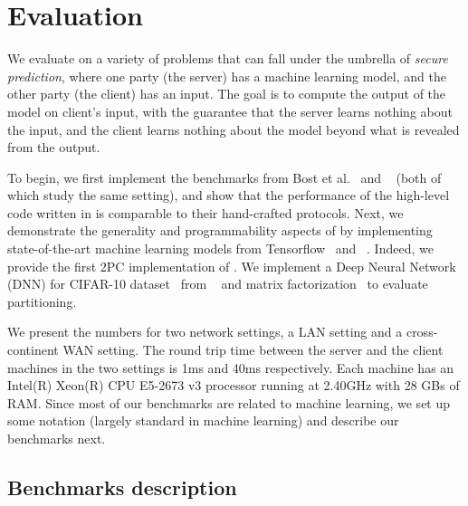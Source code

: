 \section{Evaluation}
\label{sec:eval}
We evaluate \tool on a variety of problems that can fall under the umbrella of {\it secure prediction}, where one
party (the server) has a machine learning model, and the other party
(the client) has an input. The goal is to compute the output of the
model on client's input, with the guarantee that the server
learns nothing about the input, and the client learns nothing
about the model beyond what is revealed from the output.

To begin, we first implement the benchmarks from Bost et al.~\cite{shafindss}
and \minion~\cite{minionn} (both of which study the same setting),
and show that the performance of the high-level code written in \tool
is comparable to their hand-crafted protocols.
%
Next, we demonstrate the generality and programmability aspects of
\tool by implementing state-of-the-art machine learning models from
Tensorflow~\cite{tensorflow} and \bonsai~\cite{bonsai}. Indeed, we
provide the first 2PC implementation of \bonsai.
%
We
implement a Deep Neural Network (DNN) for CIFAR-10
dataset~\cite{cifar} from \minion~\cite{minionn} and matrix factorization~\cite{valeriaMatrix}
to evaluate partitioning.

We present the numbers for two network settings, a LAN setting and
a cross-continent WAN setting. The round trip time between the server
and the client machines in the two settings is 1ms and 40ms respectively. Each
machine has an Intel(R) Xeon(R) CPU E5-2673 v3 processor running at
2.40GHz with 28 GBs of RAM.
%
Since most of our benchmarks
are related to machine learning, we set up some notation (largely
standard in machine learning) and describe our benchmarks next.

\subsection{Benchmarks description}

